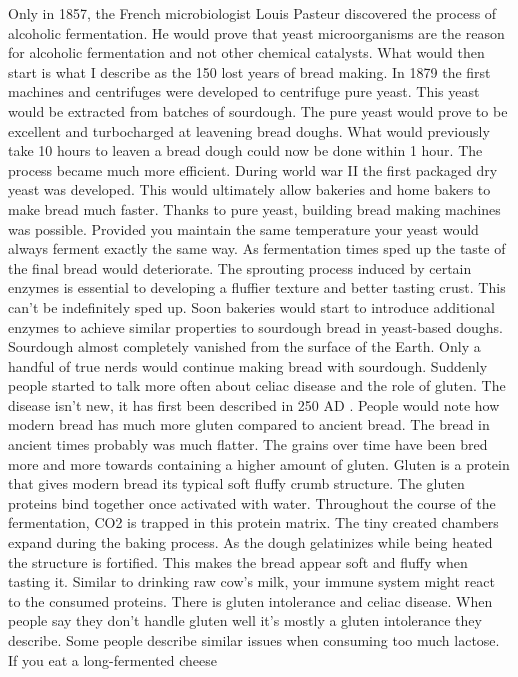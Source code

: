 Only in 1857, the French microbiologist Louis Pasteur discovered
the process of alcoholic fermentation. He would prove that
yeast microorganisms are the reason for alcoholic fermentation
and not other chemical catalysts. What would then start is
what I describe as the 150 lost years of bread making. In 1879
the first machines and centrifuges were developed to centrifuge
pure yeast. This yeast would be extracted from batches of sourdough.
The pure yeast would prove to be excellent and turbocharged
at leavening bread doughs. What would previously take 10 hours
to leaven a bread dough could now be done within 1 hour.
The process became much more efficient. During world war II
the first packaged dry yeast was developed. This would ultimately
allow bakeries and home bakers to make bread much faster.
Thanks to pure yeast, building bread making machines was
possible. Provided you maintain the same temperature
your yeast would always ferment exactly the same way. As fermentation
times sped up the taste of the final bread would deteriorate.
The sprouting process induced by certain enzymes is essential
to developing a fluffier texture and better tasting crust. This
can't be indefinitely sped up. Soon bakeries would start
to introduce additional enzymes to achieve similar properties
to sourdough bread in yeast-based doughs. Sourdough almost completely
vanished from the surface of the Earth. Only a handful
of true nerds would continue making bread with sourdough.
Suddenly people started to talk more often about celiac disease
and the role of gluten. The disease isn't new, it has first
been described in 250 AD \cite{coeliac+disease}. People
would note how modern bread has much more gluten compared
to ancient bread. The bread in ancient times probably was much flatter.
The grains over time have been bred more and more towards containing a higher
amount of gluten. Gluten is a protein that gives modern
bread its typical soft fluffy crumb structure. The
gluten proteins bind together once activated with water.
Throughout the course of the fermentation, CO2 is trapped
in this protein matrix. The tiny created chambers expand
during the baking process. As the dough gelatinizes while
being heated the structure is fortified. This makes the bread appear
soft and fluffy when tasting it. Similar to drinking raw cow's milk,
your immune system might react to the consumed proteins.
There is gluten intolerance
and celiac disease. When people say they don't handle
gluten well it's mostly a gluten intolerance they describe.
Some people describe similar issues when consuming
too much lactose. If you eat a long-fermented cheese
